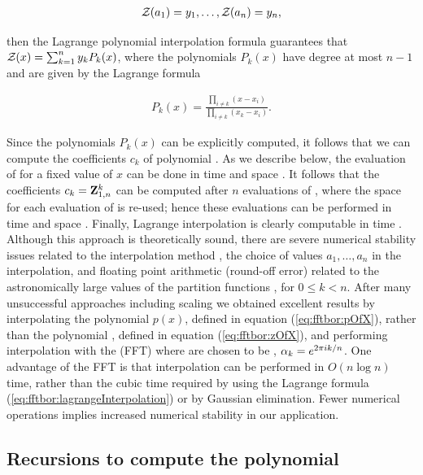 \begin{align}
\label{eq:fftbor:solutionsForAlpha}
\emZof{}{a_1} = y_1, \dots, \emZof{}{a_n} = y_n,
\end{align}

then the Lagrange polynomial interpolation formula guarantees that
${\mathcal Z}_{}(x) = \sum_{k=1}^n y_k P_k(x)$, where the polynomials $P_k(x)$ have degree
at most $n-1$ and are given by the Lagrange formula

\begin{align}
\label{eq:fftbor:lagrangeInterpolation}
P_k(x) = \frac{\prod_{i\ne k} (x-x_i)}{\prod_{i \ne k} (x_k-x_i)}.
\end{align}

Since the polynomials $P_k(x)$ can be explicitly computed, it follows that
we can compute the coefficients $c_k$ of polynomial \emZ{}. As we describe
below, the evaluation of \emZ{} for a fixed value of $x$ can be done in
time  and space .  It follows that the coefficients
$c_k={\bf Z}^{k}_{1,n}$ can be computed after
$n$ evaluations of \emZ{}, where the space for each evaluation of \emZ{}
is re-used; hence these evaluations can be performed in time  and space
. Finally,
Lagrange interpolation is clearly computable in time .
Although this approach is theoretically sound, there are severe
numerical stability issues related to the interpolation method
\cite{highambarycentricinterpolation},
the choice of values $a_1,\dots,a_{n}$ in the interpolation,
and floating point arithmetic (round-off error) related to the
astronomically large values of the partition functions
, for $0 \leq k < n$. After many unsuccessful
approaches including scaling we obtained excellent results by
interpolating the polynomial $p(x)$, defined in equation (\ref{eq:fftbor:pOfX}),
rather than the polynomial \emZ{}, defined in equation (\ref{eq:fftbor:zOfX}),
and performing interpolation with the \fft (FFT) \cite{cormen}
where \alphaN are
chosen to be \nRoUs,
$\alpha_k = e^{2 \pi i k/n}$.
One
advantage of the FFT is that interpolation can be performed in $O(n \log n)$
time, rather than the cubic time required by using the Lagrange formula
(\ref{eq:fftbor:lagrangeInterpolation}) or by Gaussian elimination. Fewer
numerical operations implies increased numerical stability in our application.

\subsection{Recursions to compute the polynomial
\texorpdfstring{}{}}
\label{subsec:fftbor:polynomial}

